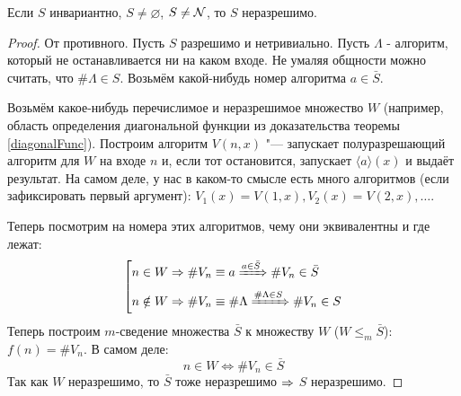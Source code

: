 \begin{theorem}\label{UspenskyRice}
	Если $S$ инвариантно, $S \ne \varnothing$, $S \ne \mathcal{N}$, то $S$ неразрешимо.
\end{theorem}
\begin{proof}
	От противного.
	Пусть $S$ разрешимо и нетривиально.
	Пусть $\Lambda$ - алгоритм, который не останавливается ни на каком входе.
	Не умаляя общности можно считать, что $\#\Lambda \in S$.
	Возьмём какой-нибудь номер алгоритма $a \in \bar{S}$.

	Возьмём какое-нибудь перечислимое и неразрешимое множество $W$ (например, область определения диагональной функции из доказательства теоремы \ref{diagonalFunc}).
	Построим алгоритм $V(n, x)$ "--- запускает полуразрешающий алгоритм для $W$ на входе $n$ и, если тот остановится, запускает $\langle a \rangle(x)$ и выдаёт результат.
	На самом деле, у нас в каком-то смысле есть много алгоритмов (если зафиксировать первый аргумент): $V_1(x)=V(1, x), V_2(x)=V(2, x), \dots$.

	Теперь посмотрим на номера этих алгоритмов, чему они эквивалентны и где лежат:
	\[
		\left[
			\begin{aligned}
			n \in W &\Rightarrow \#V_n \equiv a \xRightarrow{a \in \bar S} \#V_n \in \bar S \\
			n \notin W &\Rightarrow \#V_n \equiv \#\Lambda \xRightarrow{\#\Lambda \in S} \#V_n \in S
			\end{aligned}
		\right.
	\]
	Теперь построим $m$-сведение множества $\bar{S}$ к множеству $W$ ($W \le_m \bar S$): $f(n) = \#V_n$.
	В самом деле:
	\[ n \in W \iff \#V_n \in \bar S \]
	Так как $W$ неразрешимо, то $\bar S$ тоже неразрешимо $\Rightarrow$ $S$ неразрешимо.
\end{proof}
